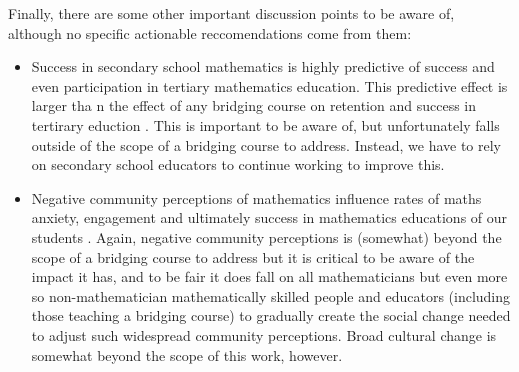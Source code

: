 \documentclass[twoside,12pt,a4paper]{report}
\begin{document}
Finally, there are some other important discussion points to be aware of, although no specific actionable reccomendations come from them:
\begin{itemize}
	\item Success in secondary school mathematics is highly predictive of success and even participation in tertiary mathematics education. This predictive effect is larger tha n the effect of any bridging course on retention and success in tertirary eduction \cite{Kajander2005, Nicholas2015b}. This is important to be aware of, but unfortunately falls outside of the scope of a bridging course to address. Instead, we have to rely on secondary school educators to continue working to improve this.
	\item Negative community perceptions of mathematics influence rates of maths anxiety, engagement and ultimately success in mathematics educations of our students \cite{King2015, Gordon2013, Clark2008}. Again, negative community perceptions is (somewhat) beyond the scope of a bridging course to address but it is critical to be aware of the impact it has, and to be fair it does fall on all mathematicians but even more so non-mathematician mathematically skilled people and educators (including those teaching a bridging course) to gradually create the social change needed to adjust such widespread community perceptions. Broad cultural change is somewhat beyond the scope of this work, however.
\end{itemize}
\end{document}
